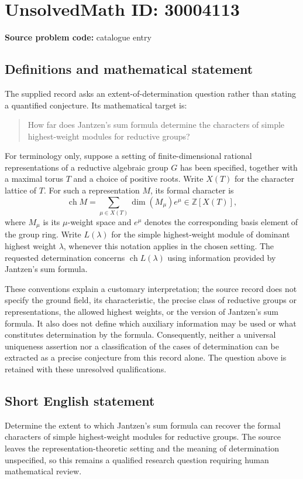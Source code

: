 \documentclass[11pt]{article}
\newcommand{\Z}{\mathbb{Z}}
\begin{document}
\section*{UnsolvedMath ID: 30004113}
\textbf{Source problem code:} catalogue entry
\subsection{Definitions and mathematical statement}
The supplied record asks an extent-of-determination question rather than stating a quantified conjecture. Its mathematical target is:
\begin{quote}
How far does Jantzen's sum formula determine the characters of simple highest-weight modules for reductive groups?
\end{quote}
For terminology only, suppose a setting of finite-dimensional rational representations of a reductive algebraic group \(G\) has been specified, together with a maximal torus \(T\) and a choice of positive roots. Write \(X(T)\) for the character lattice of \(T\). For such a representation \(M\), its formal character is
\[
\operatorname{ch} M=\sum_{\mu\in X(T)}\dim(M_\mu)e^\mu\in\Z[X(T)],
\]
where \(M_\mu\) is its \(\mu\)-weight space and \(e^\mu\) denotes the corresponding basis element of the group ring. Write \(L(\lambda)\) for the simple highest-weight module of dominant highest weight \(\lambda\), whenever this notation applies in the chosen setting. The requested determination concerns \(\operatorname{ch}L(\lambda)\) using information provided by Jantzen's sum formula.

These conventions explain a customary interpretation; the source record does not specify the ground field, its characteristic, the precise class of reductive groups or representations, the allowed highest weights, or the version of Jantzen's sum formula. It also does not define which auxiliary information may be used or what constitutes determination by the formula. Consequently, neither a universal uniqueness assertion nor a classification of the cases of determination can be extracted as a precise conjecture from this record alone. The question above is retained with these unresolved qualifications.
\subsection{Short English statement}
Determine the extent to which Jantzen's sum formula can recover the formal characters of simple highest-weight modules for reductive groups. The source leaves the representation-theoretic setting and the meaning of determination unspecified, so this remains a qualified research question requiring human mathematical review.
\end{document}
